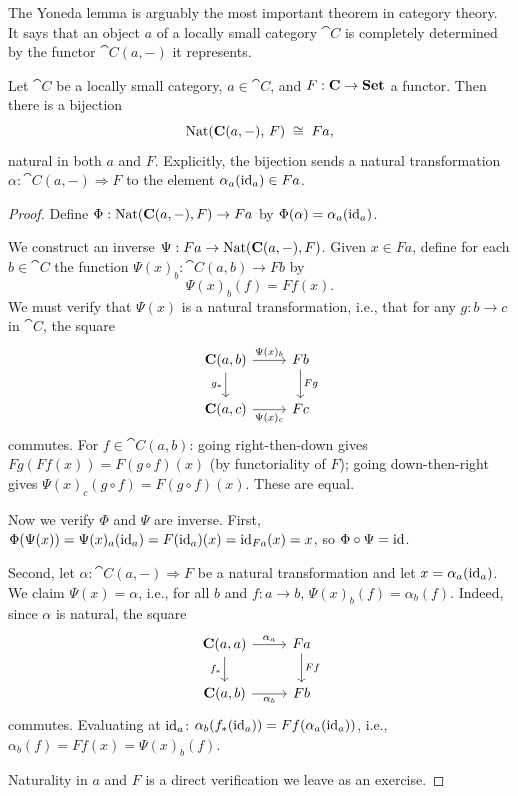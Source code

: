 The Yoneda lemma is arguably the most important theorem in category theory. It says that an object $a$ of a locally small category $\cat{C}$ is completely determined by the functor $\cat{C}(a, -)$ it represents.

\begin{theorem}
\label{thm:yoneda}
Let $\cat{C}$ be a locally small category, $a \in \cat{C}$, and $F: \mathbf{C} \to \mathbf{Set}$ a functor. Then there is a bijection
\[
  \operatorname{Nat}(\mathbf{C}(a,-),\, F) \;\cong\; Fa,
\]
natural in both $a$ and $F$. Explicitly, the bijection sends a natural transformation $\alpha: \cat{C}(a,-) \Rightarrow F$ to the element $\alpha_a(\mathrm{id}_a) \in Fa$.
\end{theorem}

\begin{proof}
Define $\Phi: \operatorname{Nat}(\mathbf{C}(a,-), F) \to Fa$ by $\Phi(\alpha) = \alpha_a(\mathrm{id}_a)$.

We construct an inverse $\Psi: Fa \to \operatorname{Nat}(\mathbf{C}(a,-), F)$. Given $x \in Fa$, define for each $b \in \cat{C}$ the function $\Psi(x)_b: \cat{C}(a,b) \to Fb$ by
\[
  \Psi(x)_b(f) = Ff(x).
\]
We must verify that $\Psi(x)$ is a natural transformation, i.e., that for any $g: b \to c$ in $\cat{C}$, the square
\[
  \begin{tikzcd}
    \cat{C}(a,b) \arrow[r, "\Psi(x)_b"] \arrow[d, "g_*"'] & Fb \arrow[d, "Fg"] \\
    \cat{C}(a,c) \arrow[r, "\Psi(x)_c"'] & Fc
  \end{tikzcd}
\]
commutes. For $f \in \cat{C}(a,b)$: going right-then-down gives $Fg(Ff(x)) = F(g \circ f)(x)$ (by functoriality of $F$); going down-then-right gives $\Psi(x)_c(g \circ f) = F(g \circ f)(x)$. These are equal.

Now we verify $\Phi$ and $\Psi$ are inverse. First, $\Phi(\Psi(x)) = \Psi(x)_a(\mathrm{id}_a) = F(\mathrm{id}_a)(x) = \mathrm{id}_{Fa}(x) = x$, so $\Phi \circ \Psi = \mathrm{id}$.

Second, let $\alpha: \cat{C}(a,-) \Rightarrow F$ be a natural transformation and let $x = \alpha_a(\mathrm{id}_a)$. We claim $\Psi(x) = \alpha$, i.e., for all $b$ and $f: a \to b$, $\Psi(x)_b(f) = \alpha_b(f)$. Indeed, since $\alpha$ is natural, the square
\[
  \begin{tikzcd}
    \cat{C}(a,a) \arrow[r, "\alpha_a"] \arrow[d, "f_*"'] & Fa \arrow[d, "Ff"] \\
    \cat{C}(a,b) \arrow[r, "\alpha_b"'] & Fb
  \end{tikzcd}
\]
commutes. Evaluating at $\mathrm{id}_a$: $\alpha_b(f_*(\mathrm{id}_a)) = Ff(\alpha_a(\mathrm{id}_a))$, i.e., $\alpha_b(f) = Ff(x) = \Psi(x)_b(f)$.

Naturality in $a$ and $F$ is a direct verification we leave as an exercise.
\end{proof}

